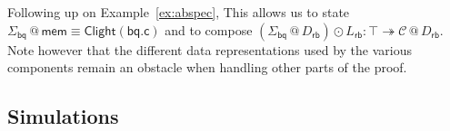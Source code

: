 \documentclass[acmsmall,screen,review,anonymous]{acmart}
\newcommand{\kw}[1]{\ensuremath{ \mathsf{#1} }}
\begin{document}

\begin{example} \label{ex:abspeclift} %
Following up on Example~\ref{ex:abspec},
This allows us to state
$\Sigma_\kw{bq} \mathbin@ \kw{mem} \equiv \kw{Clight}(\kw{bq.c})$
and to compose
$
  (\Sigma_\kw{bq} \mathbin@ D_\kw{rb}) \odot L_\kw{rb} :
  \top \twoheadrightarrow \mathcal{C} \mathbin@ D_\kw{rb}
$.
Note however that the different data representations
used by the various components
remain an obstacle when handling other parts of the proof.
\end{example}


\subsection{Simulations} \label{sec:overview:sim} %
\end{document}
